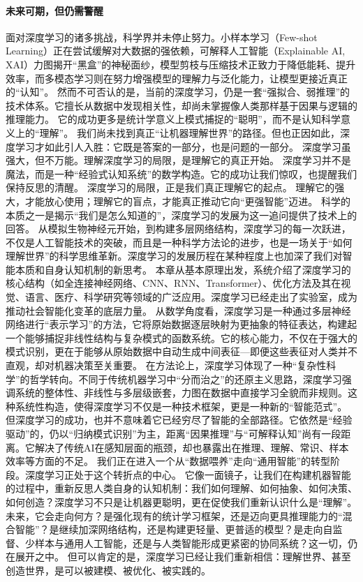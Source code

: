 \paragraph*{未来可期，但仍需警醒}
面对深度学习的诸多挑战，科学界并未停止努力。小样本学习（Few-shot Learning）正在尝试缓解对大数据的强依赖，可解释人工智能（Explainable AI, XAI）力图揭开“黑盒”的神秘面纱，模型剪枝与压缩技术正致力于降低能耗、提升效率，而多模态学习则在努力增强模型的理解力与泛化能力，让模型更接近真正的“认知”。
然而不可否认的是，当前的深度学习，仍是一套“强拟合、弱推理”的技术体系。它擅长从数据中发现相关性，却尚未掌握像人类那样基于因果与逻辑的推理能力。
它的成功更多是统计学意义上模式捕捉的“聪明”，而不是认知科学意义上的“理解”。
我们尚未找到真正“让机器理解世界”的路径。但也正因如此，深度学习才如此引人入胜：它既是答案的一部分，也是问题的一部分。
深度学习虽强大，但不万能。理解深度学习的局限，是理解它的真正开始。
深度学习并不是魔法，而是一种“经验式认知系统”的数学构造。它的成功让我们惊叹，也提醒我们保持反思的清醒。
深度学习的局限，正是我们真正理解它的起点。
理解它的强大，才能放心使用；理解它的盲点，才能真正推动它向“更强智能”迈进。
科学的本质之一是揭示“我们是怎么知道的”，深度学习的发展为这一追问提供了技术上的回答。
从模拟生物神经元开始，到构建多层网络结构，深度学习的每一次跃进，不仅是人工智能技术的突破，而且是一种科学方法论的进步，也是一场关于“如何理解世界”的科学思维革新。深度学习的发展历程在某种程度上也加深了我们对智能本质和自身认知机制的新思考。
本章从基本原理出发，系统介绍了深度学习的核心结构（如全连接神经网络、CNN、RNN、Transformer）、优化方法及其在视觉、语言、医疗、科学研究等领域的广泛应用。深度学习已经走出了实验室，成为推动社会智能化变革的底层力量。
从数学角度看，深度学习是一种通过多层神经网络进行“表示学习”的方法，它将原始数据逐层映射为更抽象的特征表达，构建起一个能够捕捉非线性结构与复杂模式的函数系统。它的核心能力，不仅在于强大的模式识别，更在于能够从原始数据中自动生成中间表征---即便这些表征对人类并不直观，却对机器决策至关重要。
在方法论上，深度学习体现了一种“复杂性科学”的哲学转向。不同于传统机器学习中“分而治之”的还原主义思路，深度学习强调系统的整体性、非线性与多层级嵌套，力图在数据中直接学习全貌而非规则。这种系统性构造，使得深度学习不仅是一种技术框架，更是一种新的“智能范式”。
但深度学习的成功，也并不意味着它已经穷尽了智能的全部路径。它依然是“经验驱动”的，仍以“归纳模式识别”为主，距离“因果推理”与“可解释认知”尚有一段距离。它解决了传统AI在感知层面的瓶颈，却也暴露出在推理、理解、常识、样本效率等方面的不足。
我们正在进入一个从“数据喂养”走向“通用智能”的转型阶段。深度学习正处于这个转折点的中心。
它像一面镜子，让我们在构建机器智能的过程中，重新反思人类自身的认知机制：我们如何理解、如何抽象、如何决策、如何创造？深度学习不只是让机器更聪明，更在促使我们重新认识什么是“理解”。
未来，它会走向何方？是强化现有的统计学习框架，还是迈向更具推理能力的“混合智能”？是继续加深网络结构，还是构建更轻量、更普适的模型？是走向自监督、少样本与通用人工智能，还是与人类智能形成更紧密的协同系统？这一切，仍在展开之中。
但可以肯定的是，深度学习已经让我们重新相信：理解世界、甚至创造世界，是可以被建模、被优化、被实践的。
\nocite{*}
\printbibliography[heading=bibintoc, title=\ebibname]
\newpage
